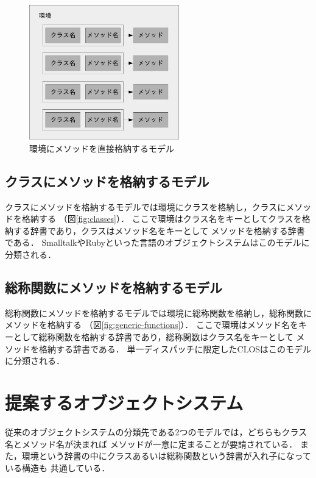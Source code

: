 \documentclass{ipsjprosym}
\begin{document}
\begin{figure}
\centering
\includegraphics[width=6.5cm]{fig/environment-crop.pdf}
\caption{環境にメソッドを直接格納するモデル}
\label{fig:environment}
\end{figure}

\subsection{クラスにメソッドを格納するモデル}
\label{sec:classes}

クラスにメソッドを格納するモデルでは環境にクラスを格納し，クラスにメソッドを格納する
（図\ref{fig:classes}）．
ここで環境はクラス名をキーとしてクラスを格納する辞書であり，クラスはメソッド名をキーとして
メソッドを格納する辞書である．
SmalltalkやRubyといった言語のオブジェクトシステムはこのモデルに分類される．

\subsection{総称関数にメソッドを格納するモデル}
\label{sec:generic-finctions}

総称関数にメソッドを格納するモデルでは環境に総称関数を格納し，総称関数にメソッドを格納する
（図\ref{fig:generic-functions}）．
ここで環境はメソッド名をキーとして総称関数を格納する辞書であり，総称関数はクラス名をキーとして
メソッドを格納する辞書である．
単一ディスパッチに限定したCLOSはこのモデルに分類される．

\section{提案するオブジェクトシステム}
\label{sec:proposal}

従来のオブジェクトシステムの分類先である2つのモデルでは，どちらもクラス名とメソッド名が決まれば
メソッドが一意に定まることが要請されている．
また，環境という辞書の中にクラスあるいは総称関数という辞書が入れ子になっている構造も
共通している．
\end{document}
